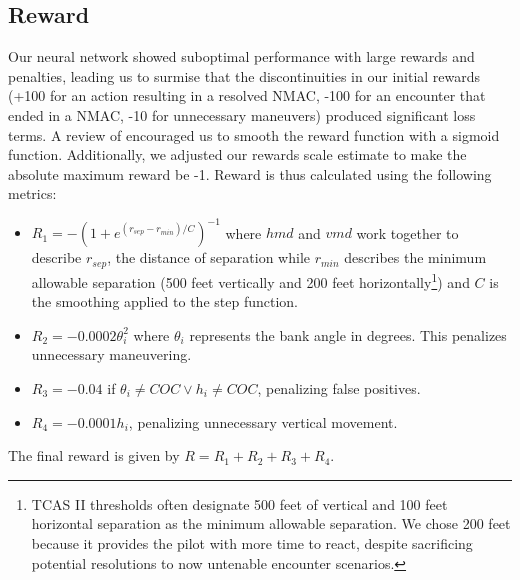 \documentclass[journal, a4paper]{IEEEtran}
\begin{document}
\subsection{Reward}
Our neural network showed suboptimal performance with large rewards and penalties, leading us to surmise that the discontinuities in our initial rewards (+100 for an action resulting in a resolved NMAC, -100 for an encounter that ended in a NMAC, -10 for unnecessary maneuvers) produced significant loss terms. A review of \cite{deeprlc} encouraged us to smooth the reward function with a sigmoid function. Additionally, we adjusted our rewards scale estimate to make the absolute maximum reward be -1. Reward is thus calculated using the following metrics:
\begin{itemize}
\item$R_1 = -(1 + e^{(r_{sep} - r_{min})/C})^{-1}$ where $hmd$ and $vmd$ work together to describe $r_{sep}$, the distance of separation while $r_{min}$ describes the minimum allowable separation (500 feet vertically and 200 feet horizontally\footnote{TCAS II thresholds often designate 500 feet of vertical and 100 feet horizontal separation as the minimum allowable separation. We chose 200 feet because it provides the pilot with more time to react, despite sacrificing potential resolutions to now untenable encounter scenarios.}) and $C$ is the smoothing applied to the step function.
\item$R_2 = -0.0002 \theta_{i}^2$ where $\theta_i$ represents the bank angle in degrees. This penalizes unnecessary maneuvering.
\item$R_3 = -0.04$ if $\theta_i \neq COC \lor h_i \neq COC$, penalizing false positives.
\item$R_4 = -0.0001 h_{i}$, penalizing unnecessary vertical movement.
\end{itemize}
The final reward is given by $R = R_1 + R_2 + R_3 + R_4$.
\end{document}
